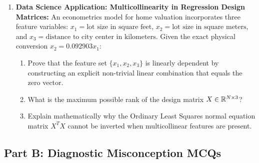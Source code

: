 \begin{enumerate}
    \item \textbf{Data Science Application: Multicollinearity in Regression Design Matrices:}
    An econometrics model for home valuation incorporates three feature variables:
    $x_1 = \text{lot size in square feet}$, $x_2 = \text{lot size in square meters}$, and $x_3 = \text{distance to city center in kilometers}$.
    Given the exact physical conversion $x_2 = 0.092903 x_1$:
    \begin{enumerate}
        \item Prove that the feature set $\{x_1, x_2, x_3\}$ is linearly dependent by constructing an explicit non-trivial linear combination that equals the zero vector.
        \item What is the maximum possible rank of the design matrix $X \in \mathbb{R}^{N \times 3}$?
        \item Explain mathematically why the Ordinary Least Squares normal equation matrix $X^T X$ cannot be inverted when multicollinear features are present.
    \end{enumerate}
\end{enumerate}

\subsection*{Part B: Diagnostic Misconception MCQs}

